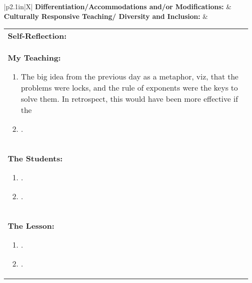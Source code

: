 \begin{small}
\begin{tabularx}{\linewidth}{|p{2.1in}|X|}
  \hline
  \textbf{Differentiation/Accommodations and/or Modifications: } & \\
  \hline
  \textbf{Culturally Responsive Teaching/ Diversity and Inclusion: } & \\
  \hline
\end{tabularx}

\vskip 6pt

\begin{tabularx}{\linewidth}{|X|}
  \hline
  \textbf{Self-Reflection:} \\
  \textbf{My Teaching:} 
  \begin{enumerate}
  \item The big idea from the previous day as a metaphor, viz, that the problems were locks, and the rule of exponents were the keys to solve them.  In retrospect, this would have been more effective if the 
  \item .
  \end{enumerate} \\
  
  \textbf{The Students:}
  \begin{enumerate}
  \item .
  \item .
  \end{enumerate} \\
  
  \textbf{The Lesson:}
  \begin{enumerate}
  \item .
  \item .
  \end{enumerate} \\
  
  \hline
\end{tabularx}
\end{small}
